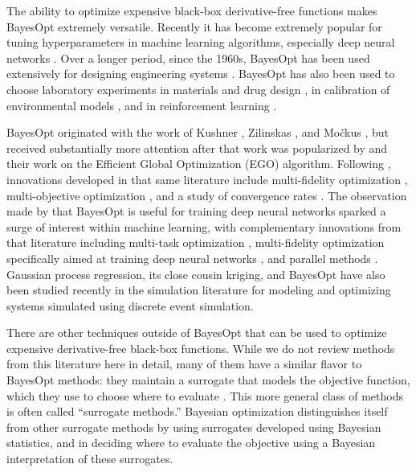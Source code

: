 \documentclass{article}
\begin{document}
The ability to optimize expensive black-box derivative-free functions makes BayesOpt extremely versatile.  Recently it has become extremely popular for tuning hyperparameters in machine learning algorithms, especially deep neural networks \citep{snoek2012practical}.
Over a longer period, since the 1960s, BayesOpt has been used extensively for designing engineering systems \citep{Mockus89,JoScWe98,FoSoKe08}.  BayesOpt has also been used to choose laboratory experiments in materials and drug design \citep{FrazierNegoescuPowell2011,frazier2016bayesian,packwood2017bayesian}, in calibration of environmental models \citep{ShReFl07}, and in reinforcement learning \citep{BrCoFr09,Li08,LiWaBoSc07}. 

BayesOpt originated with the work of Kushner \citep{Kushner64}, Zilinskas \citep{Zi75,MoTiZi78}, and Mo\v{c}kus \citep{mockus1975bayesian,Mockus89}, but received substantially more attention after that work was popularized by \cite{JoScWe98} and their work on the Efficient Global Optimization (EGO) algorithm.  Following \cite{JoScWe98}, innovations developed in that same literature include multi-fidelity optimization \citep{HuAlNoMi06,SobesterLearyKeane2004}, multi-objective optimization \citep{Ke06,Kn06,MoMo91}, and a study of convergence rates \citep{Ca97,CaZi00,CaZi05,CaZi99}.  The observation made by \cite{snoek2012practical} that BayesOpt is useful for training deep neural networks sparked a surge of interest within machine learning, with complementary innovations from that literature including multi-task optimization \citep{swersky2013multi,toscano2018bayesian}, multi-fidelity optimization specifically aimed at training deep neural networks \citep{klein2016fast}, and parallel methods \citep{GiLeCa08,GiLeCa10,wang2016parallel,wu2016parallel}.  Gaussian process regression, its close cousin kriging, and BayesOpt have also been studied recently in the simulation literature \citep{kleijnen2008design,salemi2014discrete,mehdad2018efficient} for modeling and optimizing systems simulated using discrete event simulation.

There are other techniques outside of BayesOpt that can be used to optimize expensive derivative-free black-box functions.  While we do not review methods from this literature here in detail, many of them have a similar flavor to BayesOpt methods: they maintain a surrogate that models the objective function, which they use to choose where to evaluate \citep{BoDeFrSe99,RegisShoemaker2007,ReSh07,ReSh05}. This more general class of methods is often called ``surrogate methods.''
Bayesian optimization distinguishes itself from other surrogate methods by using surrogates developed using Bayesian statistics, and in deciding where to evaluate the objective using a Bayesian interpretation of these surrogates.  
\end{document}

